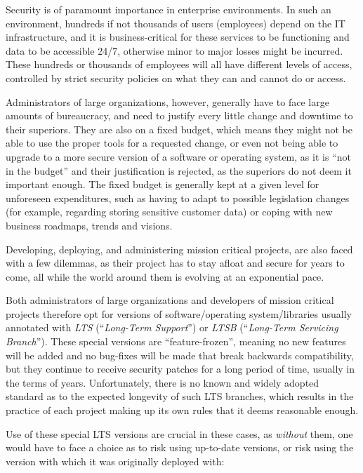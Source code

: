 \documentclass[a4paper,12pt]{article}
\begin{document}
	Security is of paramount importance in enterprise environments. In such an environment, hundreds if not thousands of users (employees) depend on the IT infrastructure, and it is business-critical for these services to be functioning and data to be accessible 24/7, otherwise minor to major losses might be incurred. These hundreds or thousands of employees will all have different levels of access, controlled by strict security policies on what they can and cannot do or access.
	
	Administrators of large organizations, however, generally have to face large amounts of bureaucracy, and need to justify every little change and downtime to their superiors. They are also on a fixed budget, which means they might not be able to use the proper tools for a requested change, or even not being able to upgrade to a more secure version of a software or operating system, as it is ``not in the budget'' and their justification is rejected, as the superiors do not deem it important enough. The fixed budget is generally kept at a given level for unforeseen expenditures, such as having to adapt to possible legislation changes (for example, regarding storing sensitive customer data) or coping with new business roadmaps, trends and visions.\cite{gkreiz06}
	
	Developing, deploying, and administering mission critical projects, are also faced with a few dilemmas, as their project has to stay afloat and secure for years to come, all while the world around them is evolving at an exponential pace.
	
	Both administrators of large organizations and developers of mission critical projects therefore opt for versions of software/operating system/libraries usually annotated with \textit{LTS} (``\textit{Long-Term Support}'') or \textit{LTSB} (``\textit{Long-Term Servicing Branch}''). These special versions are ``feature-frozen'', meaning no new features will be added and no bug-fixes will be made that break backwards compatibility, but they continue to receive security patches for a long period of time, usually in the terms of years. Unfortunately, there is no known and widely adopted standard as to the expected longevity of such LTS branches, which results in the practice of each project making up its own rules that it deems reasonable enough.
	
	Use of these special LTS versions are crucial in these cases, as \textit{without} them, one would have to face a choice as to risk using up-to-date versions, or risk using the version with which it was originally deployed with:
	
\end{document}
